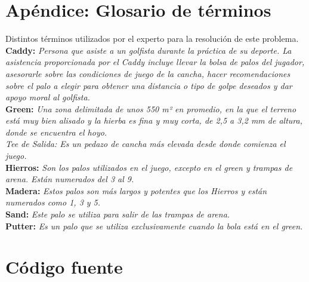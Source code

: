 \documentclass[runningheads,a4paper]{llncs}
\begin{document}
\section{Apéndice: Glosario de términos}
Distintos términos utilizados por el experto para la resolución de este problema.\\
\textbf{Caddy:} \textit{Persona que asiste a un golfista durante la práctica de su deporte. La asistencia proporcionada por el Caddy incluye llevar la bolsa de palos del jugador, asesorarle sobre las condiciones de juego de la cancha, hacer recomendaciones sobre el palo a elegir para obtener una distancia o tipo de golpe deseados y dar apoyo moral al golfista.}\\
\textbf{Green:}  \textit{Una zona delimitada de unos 550 m² en promedio, en la que el terreno está muy bien alisado y la hierba es fina y muy corta, de 2,5 a 3,2 mm de altura, donde se encuentra el hoyo.\\
Tee de Salida: Es un pedazo de cancha más elevada desde donde comienza el juego.}\\
\textbf{Hierros:} \textit{Son los palos utilizados en el juego, excepto en el green y trampas de arena. Están numerados del 3 al 9.}\\
\textbf{Madera:} \textit{Estos palos son más largos y potentes que los Hierros y están numerados como 1, 3 y 5.}\\
\textbf{Sand:} \textit{Este palo se utiliza para salir de las trampas de arena.}\\
\textbf{Putter:} \textit{Es un palo que se utiliza exclusivamente cuando la bola está en el green.}

\clearpage
\section{Código fuente}\label{sec:source}
\clearpage

\inputminted[linenos, numbersep=2pt, tabsize=2, frame=lines, label=core.clj]{clojure}{../golf-proximo-tiro/src/golf_proximo_tiro/core.clj}
\inputminted[linenos, numbersep=2pt, tabsize=2, frame=lines, label=core.clj]{clojure}{../golf-proximo-tiro/src/golf_proximo_tiro/main.clj}
\end{document}
